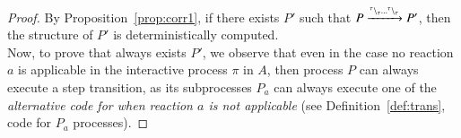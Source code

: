  \begin{proof}
By Proposition~\ref{prop:corr1}, if there exists $P'$ such that $P\xrightarrow{{}^{\tau} \backslash_{\tau}\dots {}^{\tau} \backslash_{\tau} }P'$, then the structure of  $P'$ is deterministically computed.\\
Now, to prove that always exists $P'$, we observe that even in the case no reaction $a$ is applicable in  the interactive process $\pi$ in $A$, then process $P$ can always execute a step transition, as its subprocesses $P_a$ can always execute one of the {\em alternative code
for when reaction $a$ is not applicable} (see Definition~\ref{def:trans}, code for $P_a$ processes).

 
%
%
%
%
%
%
%
\end{proof}
 
